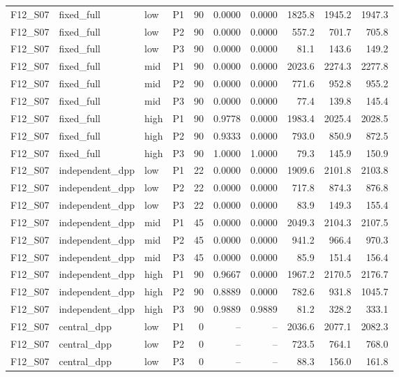 \begin{longtable}{llllrrrrrr}
F12\_S07 & fixed\_full & low & P1 & 90 & 0.0000 & 0.0000 & 1825.8 & 1945.2 & 1947.3 \\
F12\_S07 & fixed\_full & low & P2 & 90 & 0.0000 & 0.0000 & 557.2 & 701.7 & 705.8 \\
F12\_S07 & fixed\_full & low & P3 & 90 & 0.0000 & 0.0000 & 81.1 & 143.6 & 149.2 \\
F12\_S07 & fixed\_full & mid & P1 & 90 & 0.0000 & 0.0000 & 2023.6 & 2274.3 & 2277.8 \\
F12\_S07 & fixed\_full & mid & P2 & 90 & 0.0000 & 0.0000 & 771.6 & 952.8 & 955.2 \\
F12\_S07 & fixed\_full & mid & P3 & 90 & 0.0000 & 0.0000 & 77.4 & 139.8 & 145.4 \\
F12\_S07 & fixed\_full & high & P1 & 90 & 0.9778 & 0.0000 & 1983.4 & 2025.4 & 2028.5 \\
F12\_S07 & fixed\_full & high & P2 & 90 & 0.9333 & 0.0000 & 793.0 & 850.9 & 872.5 \\
F12\_S07 & fixed\_full & high & P3 & 90 & 1.0000 & 1.0000 & 79.3 & 145.9 & 150.9 \\
F12\_S07 & independent\_dpp & low & P1 & 22 & 0.0000 & 0.0000 & 1909.6 & 2101.8 & 2103.8 \\
F12\_S07 & independent\_dpp & low & P2 & 22 & 0.0000 & 0.0000 & 717.8 & 874.3 & 876.8 \\
F12\_S07 & independent\_dpp & low & P3 & 22 & 0.0000 & 0.0000 & 83.9 & 149.3 & 155.4 \\
F12\_S07 & independent\_dpp & mid & P1 & 45 & 0.0000 & 0.0000 & 2049.3 & 2104.3 & 2107.5 \\
F12\_S07 & independent\_dpp & mid & P2 & 45 & 0.0000 & 0.0000 & 941.2 & 966.4 & 970.3 \\
F12\_S07 & independent\_dpp & mid & P3 & 45 & 0.0000 & 0.0000 & 85.9 & 151.4 & 156.4 \\
F12\_S07 & independent\_dpp & high & P1 & 90 & 0.9667 & 0.0000 & 1967.2 & 2170.5 & 2176.7 \\
F12\_S07 & independent\_dpp & high & P2 & 90 & 0.8889 & 0.0000 & 782.6 & 931.8 & 1045.7 \\
F12\_S07 & independent\_dpp & high & P3 & 90 & 0.9889 & 0.9889 & 81.2 & 328.2 & 333.1 \\
F12\_S07 & central\_dpp & low & P1 & 0 & -- & -- & 2036.6 & 2077.1 & 2082.3 \\
F12\_S07 & central\_dpp & low & P2 & 0 & -- & -- & 723.5 & 764.1 & 768.0 \\
F12\_S07 & central\_dpp & low & P3 & 0 & -- & -- & 88.3 & 156.0 & 161.8 \\

\end{longtable}
